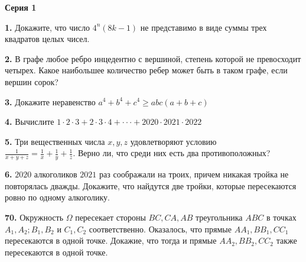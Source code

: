 \documentclass[12pt,a4paper]{article}
\def\q#1.{{\bf #1.}}
\theoremstyle{definition}
\begin{document}
\thispagestyle{firststyle}

\centerline{\bf Серия 1}


\q1. Докажите, что число $4^n(8k - 1)$ не представимо в виде суммы трех квадратов целых чисел.

\q2. В графе любое ребро инцедентно с вершиной, степень которой  не превосходит четырех. Какое наибольшее количество ребер может быть в таком графе, если вершин сорок?

\q3. Докажите неравенство $a^4 + b^4 + c^4 \geq abc(a + b + c)$

\q4. Вычислите $1 \cdot 2 \cdot 3 + 2 \cdot 3 \cdot 4 + \cdot \cdot \cdot + 2020 \cdot 2021 \cdot 2022$

\q5. Три вещественных числа $x, y, z$ удовлетворяют условию \\ $\frac{1}{x + y + z} = \frac{1}{x} + \frac{1}{y} + \frac{1}{z}$. Верно ли, что среди них есть два противоположных?

\q6. $2020$ алкоголиков $2021$ раз соображали на троих, причем никакая тройка не повторялась дважды. Докажите, что найдутся две тройки, которые пересекаются ровно по одному алкоголику.

\q70. Окружность $\Omega$ пересекает стороны $BC, CA, AB$ треугольника $ABC$ в точках $A_1, A_2; B_1, B_2$ и $C_1, C_2$ соответственно. Оказалось, что прямые $AA_1, BB_1, CC_1$ пересекаются в одной точке. Докажие, что тогда и прямые $AA_2, BB_2, CC_2$ также пересекаются в одной точке.
\end{document}
